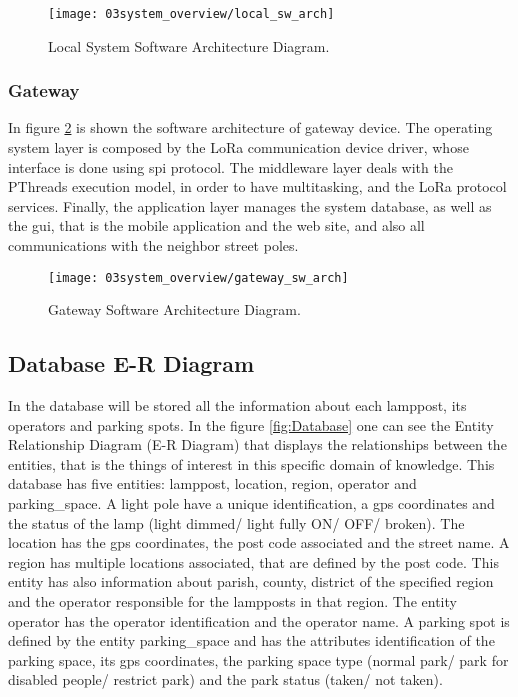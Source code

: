 \begin{figure}[H]
	\centering
	\texttt{[image: 03system\_overview/local\_sw\_arch]}
	\caption{Local System Software Architecture Diagram.}
	\label{fig:local_sw_arch}
\end{figure}

\subsubsection{Gateway}

In figure \ref{fig:gateway_sw_arch} is shown the software architecture of gateway device. The operating system layer is composed by the LoRa communication device driver, whose interface is done using \ac{spi} protocol. The middleware layer deals with the PThreads execution model, in order to have multitasking, and the LoRa protocol services. Finally, the application layer manages the system database, as well as the \ac{gui}, that is the mobile application and the web site, and also all communications with the neighbor street poles.

\begin{figure}[H]
	\centering
	\texttt{[image: 03system\_overview/gateway\_sw\_arch]}
	\caption{Gateway Software Architecture Diagram.}
	\label{fig:gateway_sw_arch}
\end{figure}

\clearpage
\subsection{Database E-R Diagram}
In the database will be stored all the information about each lamppost, its operators and parking spots. In the figure \ref{fig:Database} one can see the Entity Relationship Diagram (E-R Diagram) that displays the relationships between the entities, that is the things of interest in this specific domain of knowledge. This database has five entities: lamppost, location, region, operator and parking\_space. A light pole have a unique identification, a \ac{gps} coordinates and the status of the lamp (light dimmed/ light fully ON/ OFF/ broken). The location has the \ac{gps} coordinates, the post code associated and the street name. A region has multiple locations associated, that are defined by the post code. This entity has also information about parish, county, district of the specified region and the operator responsible for the lampposts in that region. The entity operator has the operator identification and the operator name. A parking spot is defined by the entity parking\_space and has the attributes identification of the parking space, its \ac{gps} coordinates, the parking space type (normal park/ park for disabled people/ restrict park) and the park status (taken/ not taken).

